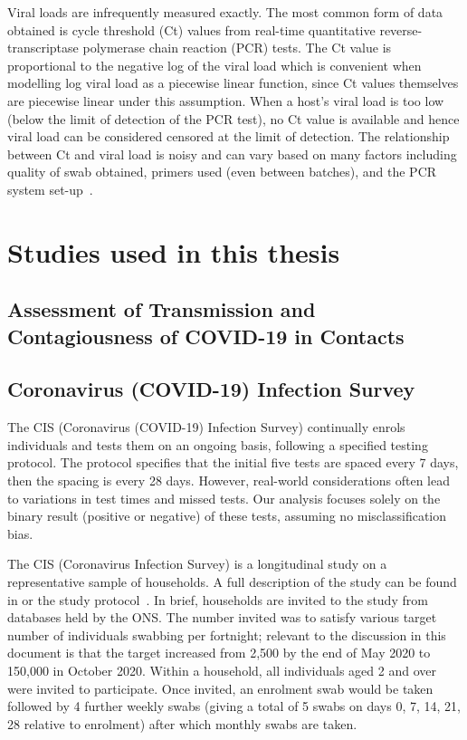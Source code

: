 \documentclass[thesis.tex]{subfiles}
\begin{document}
Viral loads are infrequently measured exactly.
The most common form of data obtained is cycle threshold (Ct) values from real-time quantitative  reverse-transcriptase polymerase chain reaction (PCR) tests.
The Ct value is proportional to the negative log of the viral load which is convenient when modelling log viral load as a piecewise linear function, since Ct values themselves are piecewise linear under this assumption.
When a host's viral load is too low (below the limit of detection of the PCR test), no Ct value is available and hence viral load can be considered censored at the limit of detection.
The relationship between Ct and viral load is noisy and can vary based on many factors including quality of swab obtained, primers used (even between batches), and the PCR system set-up~\autocites{dahdouhCt,hanRTPCR}.

\section{Studies used in this thesis}

\subsection{Assessment of Transmission and Contagiousness of COVID-19 in Contacts}

\subsection{Coronavirus (COVID-19) Infection Survey} \label{intro:sec:cis}

The CIS (Coronavirus (COVID-19) Infection Survey) continually enrols individuals and tests them on an ongoing basis, following a
specified testing protocol. The protocol specifies that the initial five
tests are spaced every 7 days, then the spacing is every 28 days.
However, real-world considerations often lead to variations in test
times and missed tests. Our analysis focuses solely on the binary result
(positive or negative) of these tests, assuming no misclassification
bias.

The CIS (Coronavirus Infection Survey) is a longitudinal study on a representative sample of households.
A full description of the study can be found in \textcite[][supplementary materials]{pouwelsCommunity} or the study protocol~\autocite{cisProtocol}.
In brief, households are invited to the study from databases held by the ONS.
The number invited was to satisfy various target number of individuals swabbing per fortnight; relevant to the discussion in this document is that the target increased from 2,500 by the end of May 2020 to 150,000 in October 2020.
Within a household, all individuals aged 2 and over were invited to participate.
Once invited, an enrolment swab would be taken followed by 4 further weekly swabs (giving a total of 5 swabs on days 0, 7, 14, 21, 28 relative to enrolment) after which monthly swabs are taken.
\end{document}
